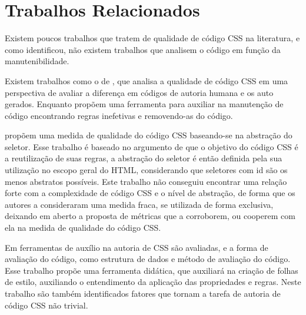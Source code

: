 %
%

\chapter{Trabalhos Relacionados}

Existem poucos trabalhos que tratem de qualidade de código CSS na literatura, e como  identificou, não existem trabalhos que analisem o código em função da manutenibilidade.

Existem trabalhos como o de , que analisa a qualidade de código CSS em uma perspectiva de avaliar a diferença em códigos de autoria humana e os auto gerados. Enquanto  propõem uma ferramenta para auxiliar na manutenção de código encontrando regras inefetivas e removendo-as do código.

 propõem uma medida de qualidade do código CSS baseando-se na abstração do seletor. Esse trabalho é baseado no argumento de que o objetivo do código CSS é a reutilização de suas regras, a abstração do seletor é então definida pela sua utilização no escopo geral do HTML, considerando que seletores com id são os menos abstratos possíveis. Este trabalho não conseguiu encontrar uma relação forte com a complexidade de código CSS e o nível de abstração, de forma que os autores a consideraram uma medida fraca, se utilizada de forma exclusiva, deixando em aberto a proposta de métricas que a corroborem, ou cooperem com ela na medida de qualidade do código CSS.

Em  ferramentas de auxílio na autoria de CSS são avaliadas, e a forma de avaliação do código, como estrutura de dados e método de avaliação do código. Esse trabalho propõe uma ferramenta didática, que auxiliará na criação de folhas de estilo, auxiliando o entendimento da aplicação das propriedades e regras. Neste trabalho são também identificados fatores que tornam a tarefa de autoria de código CSS não trivial.
